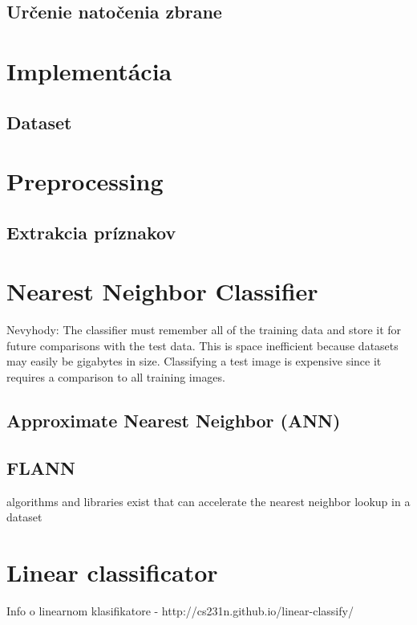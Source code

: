 \documentclass[10pt,a4paper]{article}
\begin{document}
\subsection{Určenie natočenia zbrane}


\pagebreak
\section{Implementácia}

\subsection{Dataset}


\pagebreak

\section{Preprocessing}

\subsection{Extrakcia príznakov}



\section{Nearest Neighbor Classifier}

Nevyhody:
The classifier must remember all of the training data and store it for future comparisons with the test data. This is space inefficient because datasets may easily be gigabytes in size.
Classifying a test image is expensive since it requires a comparison to all training images.

\subsection{Approximate Nearest Neighbor (ANN)}

\subsection{FLANN}
algorithms and libraries exist that can accelerate the nearest neighbor lookup in a dataset



\section{Linear classificator}
Info o linearnom klasifikatore - http://cs231n.github.io/linear-classify/
\end{document}
